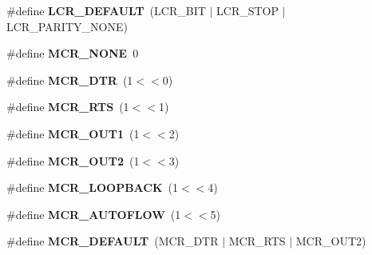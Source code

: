 \begin{DoxyCompactItemize}
\item 
\hypertarget{group__hal__dos_gaf3256e1cdd81ee02b9b694c3e45f8d33}{\#define {\bfseries L\-C\-R\-\_\-\-D\-E\-F\-A\-U\-L\-T}~(L\-C\-R\-\_\-B\-I\-T $|$ L\-C\-R\-\_\-S\-T\-O\-P $|$ L\-C\-R\-\_\-\-P\-A\-R\-I\-T\-Y\-\_\-\-N\-O\-N\-E)}\label{group__hal__dos_gaf3256e1cdd81ee02b9b694c3e45f8d33}

\item 
\hypertarget{group__hal__dos_gad313b1aec7d507ae1ca1e9c372d52454}{\#define {\bfseries M\-C\-R\-\_\-\-N\-O\-N\-E}~0}\label{group__hal__dos_gad313b1aec7d507ae1ca1e9c372d52454}

\item 
\hypertarget{group__hal__dos_ga213d57e849bb18388f24d65874af6325}{\#define {\bfseries M\-C\-R\-\_\-\-D\-T\-R}~(1$<$$<$0)}\label{group__hal__dos_ga213d57e849bb18388f24d65874af6325}

\item 
\hypertarget{group__hal__dos_gaed27b96a2b261695692cfdec8bf8b1c5}{\#define {\bfseries M\-C\-R\-\_\-\-R\-T\-S}~(1$<$$<$1)}\label{group__hal__dos_gaed27b96a2b261695692cfdec8bf8b1c5}

\item 
\hypertarget{group__hal__dos_ga2628a4fa8d48830ccea7fab2ef08c5d9}{\#define {\bfseries M\-C\-R\-\_\-\-O\-U\-T1}~(1$<$$<$2)}\label{group__hal__dos_ga2628a4fa8d48830ccea7fab2ef08c5d9}

\item 
\hypertarget{group__hal__dos_ga3469b6cce183c5fee697856acc404952}{\#define {\bfseries M\-C\-R\-\_\-\-O\-U\-T2}~(1$<$$<$3)}\label{group__hal__dos_ga3469b6cce183c5fee697856acc404952}

\item 
\hypertarget{group__hal__dos_ga95592ff726b61e0780b0d4c7c7c26fcb}{\#define {\bfseries M\-C\-R\-\_\-\-L\-O\-O\-P\-B\-A\-C\-K}~(1$<$$<$4)}\label{group__hal__dos_ga95592ff726b61e0780b0d4c7c7c26fcb}

\item 
\hypertarget{group__hal__dos_gadaf99d8ba6dea7d12c2551f9ba0d000a}{\#define {\bfseries M\-C\-R\-\_\-\-A\-U\-T\-O\-F\-L\-O\-W}~(1$<$$<$5)}\label{group__hal__dos_gadaf99d8ba6dea7d12c2551f9ba0d000a}

\item 
\hypertarget{group__hal__dos_ga3041367c1e3b71ea438e88b68d90d725}{\#define {\bfseries M\-C\-R\-\_\-\-D\-E\-F\-A\-U\-L\-T}~(M\-C\-R\-\_\-\-D\-T\-R $|$ M\-C\-R\-\_\-\-R\-T\-S $|$ M\-C\-R\-\_\-\-O\-U\-T2)}\label{group__hal__dos_ga3041367c1e3b71ea438e88b68d90d725}


\end{DoxyCompactItemize}
